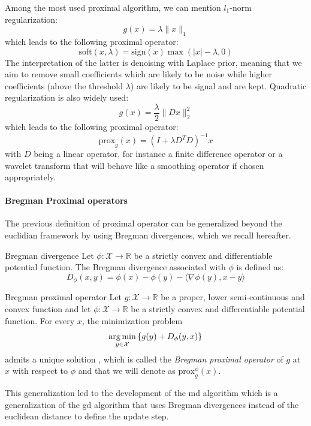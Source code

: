 Among the most used proximal algorithm, we can mention $l_1$-norm regularization:
\begin{equation}
    g(x) = \lambda \|x\|_1
\end{equation}
which leads to the following proximal operator:
\begin{equation}
    \text{soft}(x, \lambda) = \text{sign}(x) \max(|x| - \lambda, 0)
\end{equation}
The interpretation of the latter is denoising with Laplace prior, meaning that we aim to remove small coefficients which are likely to be noise while higher coefficients (above the threshold $\lambda$) are likely to be signal and are kept.
Quadratic regularization is also widely used:
\begin{equation}
    g(x) = \frac{\lambda}{2} \|Dx\|_2^2
\end{equation}
which leads to the following proximal operator:
\begin{equation}
    \text{prox}_g(x) = (I + \lambda D^T D)^{-1} x
\end{equation}
with $D$ being a linear operator, for instance a finite difference operator or a wavelet transform that will behave like a smoothing operator if chosen appropriately.

\paragraph{Bregman Proximal operators}

The previous definition of proximal operator can be generalized beyond the euclidian framework by using Bregman divergences, which we recall hereafter.
\begin{definition}{Bregman divergence}
    Let $\phi: \mathcal{X} \to \mathbb{R}$ be a strictly convex and differentiable potential function. The Bregman divergence associated with $\phi$ is defined as:
    \begin{equation}
        D_{\phi}(x, y) = \phi(x) - \phi(y) - \langle \nabla \phi(y), x - y \rangle
    \end{equation}
    \label{def:bregman_divergence}
\end{definition}
\begin{definition}{Bregman proximal operator}
    Let $g: \mathcal{X} \to \mathbb{R}$ be a proper, lower semi-continuous and convex function and let $\phi: \mathcal{X} \to \mathbb{R}$ be a strictly convex and differentiable potential function.
    For every $x$, the minimization problem
    \begin{equation}
        \mathop{\mathrm{arg\,min}}_{y \in \mathcal{X}} \left\{ g(y) + D_{\phi}(y, x) \right\}
    \end{equation}
    admits a unique solution \cite{Chen1993}, which is called the \textit{Bregman proximal operator} of $g$ at $x$ with respect to $\phi$ and that we will denote as $\text{prox}_g^{\phi}(x)$.
    \label{def:bregman_proximal_operator}
\end{definition}
This generalization led to the development of the \acrfull{md} algorithm \cite{nemirovsky1983problem} which is a generalization of the \acrfull{gd} algorithm that uses Bregman divergences instead of the euclidean distance to define the update step.

